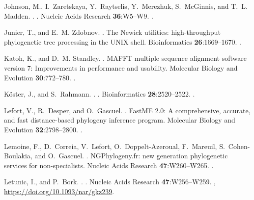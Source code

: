\begin{multicols}{2}
\begin{thebibliography}{37}
Johnson, M., I.~Zaretskaya, Y.~Raytselis, Y.~Merezhuk, S.~McGinnis, and T.~L.
  Madden.
.
.
\newblock Nucleic Acids Research {\bfseries 36}:W5--W9.
\newblock {}.

Junier, T., and E.~M. Zdobnov.
.
\newblock The Newick utilities: high-throughput phylogenetic tree processing in
  the UNIX shell.
\newblock Bioinformatics {\bfseries 26}:1669--1670.
\newblock {}.

Katoh, K., and D.~M. Standley.
.
\newblock MAFFT multiple sequence alignment software version 7: Improvements in
  performance and usability.
\newblock Molecular Biology and Evolution {\bfseries 30}:772--780.
\newblock {}.

Köster, J., and S.~Rahmann.
.
.
\newblock Bioinformatics {\bfseries 28}:2520--2522.
\newblock {}.

Lefort, V., R.~Desper, and O.~Gascuel.
.
\newblock FastME 2.0: A comprehensive, accurate, and fast distance-based
  phylogeny inference program.
\newblock Molecular Biology and Evolution {\bfseries 32}:2798--2800.
\newblock {}.

Lemoine, F., D.~Correia, V.~Lefort, O.~Doppelt-Azeroual, F.~Mareuil,
  S.~Cohen-Boulakia, and O.~Gascuel.
.
\newblock NGPhylogeny.fr: new generation phylogenetic services for
  non-specialists.
\newblock Nucleic Acids Research {\bfseries 47}:W260--W265.
\newblock {}.

Letunic, I., and P.~Bork.
.
.
\newblock Nucleic Acids Research {\bfseries 47}:W256--W259.
\newblock {},
  \urlprefix\url{https://doi.org/10.1093/nar/gkz239}.


\end{thebibliography}
\end{multicols}

